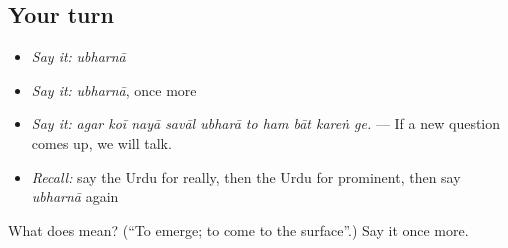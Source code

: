 \subsection*{Your turn}
\begin{itemize}
\raggedright
  \item \emph{Say it:} \emph{ubharnā}
  \item \emph{Say it:} \emph{ubharnā}, once more
  \item \emph{Say it:} \emph{agar koī nayā savāl ubharā to ham bāt kareṅ ge.} — If a new question comes up, we will talk.
  \item \emph{Recall:} say the Urdu for really, then the Urdu for prominent, then say \emph{ubharnā} again
\end{itemize}

\begin{tcolorbox}[breakable,colback=teal!4,colframe=teal!35!black,title={Before you move on}]
What does  mean? (\textquotedblleft{}To emerge; to come to the surface\textquotedblright{}.) Say it once more.
\end{tcolorbox}
